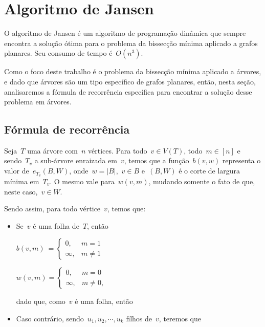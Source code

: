 \section {Algoritmo de Jansen}

O algoritmo de Jansen é um algoritmo de 
programação dinâmica que sempre encontra
a solução ótima para o problema da bissecção
mínima aplicado a grafos planares.
Seu consumo de tempo é~$O(n^3)$.

Como o foco deste trabalho é o problema da 
bissecção mínima aplicado a árvores, e dado
que árvores são um tipo específico de grafos
planares, então, nesta seção, analisaremos a 
fórmula de recorrência específica para encontrar
a solução desse problema em árvores. 

\bigskip

\subsection*{Fórmula de recorrência}

Seja~$T$ uma árvore com~$n$ vértices. 
Para todo~${v\in V(T)}$, todo~${m\in[n]}$
e sendo~$T_v$ a sub-árvore enraizada em~$v$,
temos que a função~$b(v,w)$ representa o valor
de~$e_{T_v}(B,W)$, onde~${w=|B|}$,~${v\in B}$
e~$(B,W)$ é o corte de largura mínima em~$T_v$.
O mesmo vale para~$w(v,m)$, mudando somente
o fato de que, neste caso,~$v\in W$.

Sendo assim, para todo vértice~$v$, temos que:

\begin{itemize}
\item Se~$v$ é uma folha de~$T$, então

\bigskip

$ b(v,m)~ = 
\begin{cases}
	0, &m=1 \\
	\infty, &m\ne 1
\end{cases}$

\medskip

$w(v,m) = 
\begin{cases}
	0, &m=0 \\
	\infty, &m\ne 0,
\end{cases}$

dado que, como~$v$ é uma folha, então

\item Caso contrário, sendo~$u_1,u_2,\cdots,u_k$
filhos de~$v$, teremos que

\end{itemize}